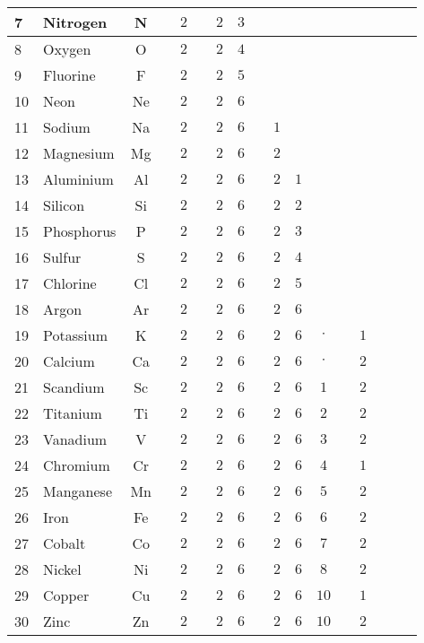 \begin{table}[H]
\begin{center}
\begin{tabular}{|l|lc|c|c|c|c|c|c|c|c|c|c|c|c|c|c|}
				7 & Nitrogen & N & & $2$ & & $2$ & $3$ \\ \hline
				8 & Oxygen & O & & $2$ & & $2$ & $4$ \\ \hline
				9 & Fluorine & F & & $2$ & & $2$ & $5$ \\ \hline
				10 & Neon & Ne & & $2$ & & $2$ & $6$ \\ \hline
				11 & Sodium & Na & & $2$ & & $2$ & $6$ & & $1$ \\ \hline
				12 & Magnesium & Mg & & $2$ & & $2$ & $6$ & & $2$ \\ \hline
				13 & Aluminium & Al & & $2$ & & $2$ & $6$ & & $2$ & $1$ \\ \hline
				14 & Silicon & Si & & $2$ & & $2$ & $6$ & & $2$ & $2$ \\ \hline
				15 & Phosphorus & P & & $2$ & & $2$ & $6$ & & $2$ & $3$ \\ \hline
				16 & Sulfur & S & & $2$ & & $2$ & $6$ & & $2$ & $4$ \\ \hline
				17 & Chlorine & Cl & & $2$ & & $2$ & $6$ & & $2$ & $5$ \\ \hline
				18 & Argon & Ar & & $2$ & & $2$ & $6$ & & $2$ & $6$ \\ \hline
				19 & Potassium & K & & $2$ & & $2$ & $6$ & & $2$ & $6$ & $\cdot$ & & $1$ \\ \hline
				20 & Calcium & Ca & & $2$ & & $2$ & $6$ & & $2$ & $6$ & $\cdot$ & & $2$ \\ \hline
				21 & Scandium & Sc & & $2$ & & $2$ & $6$ & & $2$ & $6$ & $1$ & & $2$ \\ \hline
				22 & Titanium & Ti & & $2$ & & $2$ & $6$ & & $2$ & $6$ & $2$ & & $2$ \\ \hline
				23 & Vanadium & V & & $2$ & & $2$ & $6$ & & $2$ & $6$ & $3$ & & $2$ \\ \hline
				24 & Chromium & Cr & & $2$ & & $2$ & $6$ & & $2$ & $6$ & $4$ & & $1$ \\ \hline
				25 & Manganese & Mn & & $2$ & & $2$ & $6$ & & $2$ & $6$ & $5$ & & $2$ \\ \hline
				26 & Iron & Fe & & $2$ & & $2$ & $6$ & & $2$ & $6$ & $6$ & & $2$ \\ \hline
				27 & Cobalt & Co & & $2$ & & $2$ & $6$ & & $2$ & $6$ & $7$ & & $2$ \\ \hline
				28 & Nickel & Ni & & $2$ & & $2$ & $6$ & & $2$ & $6$ & $8$ & & $2$ \\ \hline
				29 & Copper & Cu & & $2$ & & $2$ & $6$ & & $2$ & $6$ & $10$ & & $1$ \\ \hline
				30 & Zinc & Zn & & $2$ & & $2$ & $6$ & & $2$ & $6$ & $10$ & & $2$ \\ \hline

\end{tabular}
\end{center}
\end{table}
